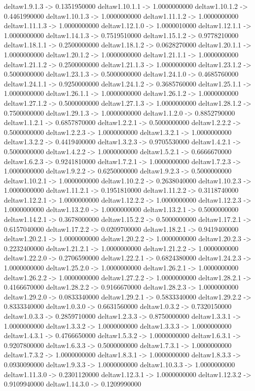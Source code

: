 deltaw1.9.1.3 -> 0.1351950000    deltaw1.10.1.1 -> 1.0000000000    deltaw1.10.1.2 -> 0.4461990000    deltaw1.10.1.3 -> 1.0000000000    deltaw1.11.1.2 -> 1.0000000000    deltaw1.11.1.3 -> 1.0000000000    deltaw1.12.1.0 -> 1.0000010000    deltaw1.12.1.1 -> 1.0000000000    deltaw1.14.1.3 -> 0.7519510000    deltaw1.15.1.2 -> 0.9778210000    deltaw1.18.1.1 -> 0.2500000000    deltaw1.18.1.2 -> 0.0628270000    deltaw1.20.1.1 -> 1.0000000000    deltaw1.20.1.2 -> 1.0000000000    deltaw1.21.1.1 -> 1.0000000000    deltaw1.21.1.2 -> 0.2500000000    deltaw1.21.1.3 -> 1.0000000000    deltaw1.23.1.2 -> 0.5000000000    deltaw1.23.1.3 -> 0.5000000000    deltaw1.24.1.0 -> 0.4685760000    deltaw1.24.1.1 -> 0.9250000000    deltaw1.24.1.2 -> 0.3685760000    deltaw1.25.1.1 -> 1.0000000000    deltaw1.26.1.1 -> 1.0000000000    deltaw1.26.1.2 -> 1.0000000000    deltaw1.27.1.2 -> 0.5000000000    deltaw1.27.1.3 -> 1.0000000000    deltaw1.28.1.2 -> 0.7500000000    deltaw1.29.1.3 -> 1.0000000000    deltaw1.1.2.0 -> 0.8852790000    deltaw1.1.2.1 -> 0.6857870000    deltaw1.2.2.1 -> 0.5000000000    deltaw1.2.2.2 -> 0.5000000000    deltaw1.2.2.3 -> 1.0000000000    deltaw1.3.2.1 -> 1.0000000000    deltaw1.3.2.2 -> 0.4419400000    deltaw1.3.2.3 -> 0.9705530000    deltaw1.4.2.1 -> 0.5000000000    deltaw1.4.2.2 -> 1.0000000000    deltaw1.5.2.1 -> 0.6666670000    deltaw1.6.2.3 -> 0.9241810000    deltaw1.7.2.1 -> 1.0000000000    deltaw1.7.2.3 -> 1.0000000000    deltaw1.9.2.2 -> 0.6250000000    deltaw1.9.2.3 -> 0.5000000000    deltaw1.10.2.1 -> 1.0000000000    deltaw1.10.2.2 -> 0.2638040000    deltaw1.10.2.3 -> 1.0000000000    deltaw1.11.2.1 -> 0.1951810000    deltaw1.11.2.2 -> 0.3118740000    deltaw1.12.2.1 -> 1.0000000000    deltaw1.12.2.2 -> 1.0000000000    deltaw1.12.2.3 -> 1.0000000000    deltaw1.13.2.0 -> 1.0000000000    deltaw1.13.2.1 -> 0.5000000000    deltaw1.14.2.1 -> 0.3678000000    deltaw1.15.2.2 -> 0.5000000000    deltaw1.17.2.1 -> 0.6157040000    deltaw1.17.2.2 -> 0.0209700000    deltaw1.18.2.1 -> 0.9419400000    deltaw1.20.2.1 -> 1.0000000000    deltaw1.20.2.2 -> 1.0000000000    deltaw1.20.2.3 -> 0.2232400000    deltaw1.21.2.1 -> 1.0000000000    deltaw1.21.2.2 -> 1.0000000000    deltaw1.22.2.0 -> 0.2706590000    deltaw1.22.2.1 -> 0.6824380000    deltaw1.24.2.3 -> 1.0000000000    deltaw1.25.2.0 -> 1.0000000000    deltaw1.26.2.1 -> 1.0000000000    deltaw1.26.2.2 -> 1.0000000000    deltaw1.27.2.2 -> 1.0000000000    deltaw1.28.2.1 -> 0.4166670000    deltaw1.28.2.2 -> 0.9166670000    deltaw1.28.2.3 -> 1.0000000000    deltaw1.29.2.0 -> 0.0833340000    deltaw1.29.2.1 -> 0.5833340000    deltaw1.29.2.2 -> 0.8333340000    deltaw1.0.3.0 -> 0.6631560000    deltaw1.0.3.2 -> 0.7320150000    deltaw1.0.3.3 -> 0.2859710000    deltaw1.2.3.3 -> 0.8750000000    deltaw1.3.3.1 -> 1.0000000000    deltaw1.3.3.2 -> 1.0000000000    deltaw1.3.3.3 -> 1.0000000000    deltaw1.4.3.1 -> 0.4766650000    deltaw1.5.3.2 -> 1.0000000000    deltaw1.6.3.1 -> 0.9207800000    deltaw1.6.3.3 -> 0.5000000000    deltaw1.7.3.1 -> 1.0000000000    deltaw1.7.3.2 -> 1.0000000000    deltaw1.8.3.1 -> 1.0000000000    deltaw1.8.3.3 -> 0.0930090000    deltaw1.9.3.3 -> 1.0000000000    deltaw1.10.3.3 -> 1.0000000000    deltaw1.11.3.0 -> 0.2301120000    deltaw1.12.3.1 -> 1.0000000000    deltaw1.12.3.2 -> 0.9109940000    deltaw1.14.3.0 -> 0.1209990000    